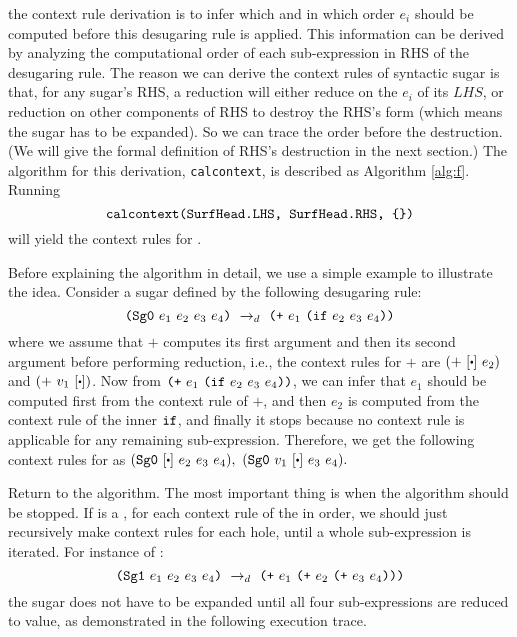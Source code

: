 the context rule derivation is to infer which and in which order $e_i$ should be computed before this desugaring rule is applied. This information can be derived by analyzing the computational order of each sub-expression in RHS of the desugaring rule. The reason we can derive the context rules of syntactic sugar is that, for any sugar's RHS, a reduction will either reduce on the $e_i$ of its $LHS$, or reduction on other components of RHS to destroy the RHS's form (which means the sugar has to be expanded). So we can trace the order before the destruction. (We will give the formal definition of RHS's destruction in the next section.) The algorithm for this derivation, \texttt{calcontext}, is described as Algorithm \ref{alg:f}. Running
\[
 \texttt{calcontext(\mbox{\tt SurfHead}.LHS,~\mbox{\tt SurfHead}.RHS, \{\})}
\]
will yield the context rules for .

Before explaining the algorithm in detail, we use a simple example to illustrate the idea.
Consider a sugar  defined by the following desugaring rule:
\[
\mbox{\tt (Sg0}~e_1~e_2~e_3~e_4\mbox{\tt )} ~\rightarrow_d~ \mbox{\tt (+}~e_1~\mbox{\tt (if}~e_2~e_3~e_4\mbox{\tt ))}
\]
where we assume that $+$ computes its first argument and then its second argument before performing reduction, i.e., the context rules for $+$ are  $(+~[\bigcdot]~e_2)$ and $(+~v_1~[\bigcdot])$. Now from $\mbox{\tt (+}~e_1~\mbox{\tt (if}~e_2~e_3~e_4\mbox{\tt ))}$, we can infer that $e_1$ should be computed first from the context rule of $+$, and then $e_2$ is computed from the context rule of the inner $\mbox{\tt if}$, and finally it stops because no context rule is applicable for any remaining sub-expression. Therefore, we get the following context rules for  as
$
(\m{Sg0}~[\bigcdot]~e_2~e_3~e_4),~(\m{Sg0}~v_1~[\bigcdot]~e_3~e_4).
$

Return to the algorithm. The most important thing is when the algorithm should be stopped. If  is a , for each context rule of the  in order, we should just recursively make context rules for each hole, until a whole sub-expression is iterated. For instance of :
\[
\mbox{\tt (Sg1}~e_1~e_2~e_3~e_4\mbox{\tt )} ~\rightarrow_d~ \mbox{\tt (+}~e_1~\mbox{\tt (+}~e_2~\mbox{\tt (+}~e_3~e_4\mbox{\tt )))}
\]
the sugar does not have to be expanded until all four sub-expressions are reduced to value, as demonstrated in the following execution trace.


